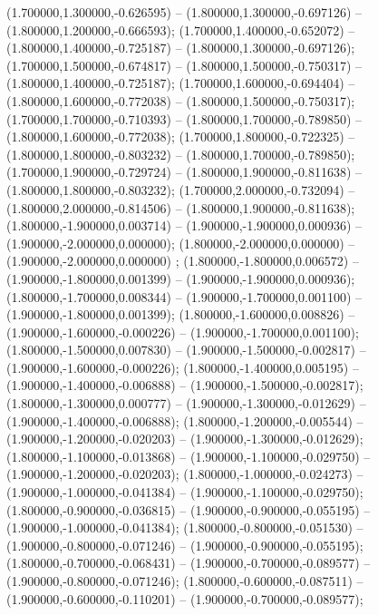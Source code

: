  (1.700000,1.300000,-0.626595) -- (1.800000,1.300000,-0.697126) -- (1.800000,1.200000,-0.666593);
 (1.700000,1.400000,-0.652072) -- (1.800000,1.400000,-0.725187) -- (1.800000,1.300000,-0.697126);
 (1.700000,1.500000,-0.674817) -- (1.800000,1.500000,-0.750317) -- (1.800000,1.400000,-0.725187);
 (1.700000,1.600000,-0.694404) -- (1.800000,1.600000,-0.772038) -- (1.800000,1.500000,-0.750317);
 (1.700000,1.700000,-0.710393) -- (1.800000,1.700000,-0.789850) -- (1.800000,1.600000,-0.772038);
 (1.700000,1.800000,-0.722325) -- (1.800000,1.800000,-0.803232) -- (1.800000,1.700000,-0.789850);
 (1.700000,1.900000,-0.729724) -- (1.800000,1.900000,-0.811638) -- (1.800000,1.800000,-0.803232);
 (1.700000,2.000000,-0.732094) -- (1.800000,2.000000,-0.814506) -- (1.800000,1.900000,-0.811638);
 (1.800000,-1.900000,0.003714) -- (1.900000,-1.900000,0.000936) -- (1.900000,-2.000000,0.000000);
 (1.800000,-2.000000,0.000000) -- (1.900000,-2.000000,0.000000) ;
 (1.800000,-1.800000,0.006572) -- (1.900000,-1.800000,0.001399) -- (1.900000,-1.900000,0.000936);
 (1.800000,-1.700000,0.008344) -- (1.900000,-1.700000,0.001100) -- (1.900000,-1.800000,0.001399);
 (1.800000,-1.600000,0.008826) -- (1.900000,-1.600000,-0.000226) -- (1.900000,-1.700000,0.001100);
 (1.800000,-1.500000,0.007830) -- (1.900000,-1.500000,-0.002817) -- (1.900000,-1.600000,-0.000226);
 (1.800000,-1.400000,0.005195) -- (1.900000,-1.400000,-0.006888) -- (1.900000,-1.500000,-0.002817);
 (1.800000,-1.300000,0.000777) -- (1.900000,-1.300000,-0.012629) -- (1.900000,-1.400000,-0.006888);
 (1.800000,-1.200000,-0.005544) -- (1.900000,-1.200000,-0.020203) -- (1.900000,-1.300000,-0.012629);
 (1.800000,-1.100000,-0.013868) -- (1.900000,-1.100000,-0.029750) -- (1.900000,-1.200000,-0.020203);
 (1.800000,-1.000000,-0.024273) -- (1.900000,-1.000000,-0.041384) -- (1.900000,-1.100000,-0.029750);
 (1.800000,-0.900000,-0.036815) -- (1.900000,-0.900000,-0.055195) -- (1.900000,-1.000000,-0.041384);
 (1.800000,-0.800000,-0.051530) -- (1.900000,-0.800000,-0.071246) -- (1.900000,-0.900000,-0.055195);
 (1.800000,-0.700000,-0.068431) -- (1.900000,-0.700000,-0.089577) -- (1.900000,-0.800000,-0.071246);
 (1.800000,-0.600000,-0.087511) -- (1.900000,-0.600000,-0.110201) -- (1.900000,-0.700000,-0.089577);
